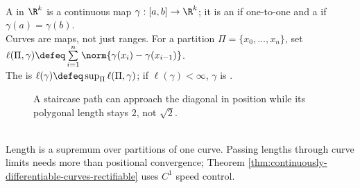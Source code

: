 \begin{definition} \label{def:curves-and-rectifiability} \\
A  in $\R^k$ is a continuous map $\gamma:[a,b]\to\R^k$; it is an  if one-to-one and a  if $\gamma(a)=\gamma(b)$.\\
Curves are maps, not just ranges. For a partition $\Pi=\{x_0,\ldots,x_n\}$, set $\ell(\Pi,\gamma)\defeq\sum\limits_{i=1}^{n}\norm{\gamma(x_i)-\gamma(x_{i-1})}$.\\
The  is $\ell(\gamma)\defeq\sup_\Pi\ell(\Pi,\gamma)$; if $\ell(\gamma)<\infty$, $\gamma$ is .
\end{definition}

\begin{figure}[H]
  \centering
  
  \caption{A staircase path can approach the diagonal in position while its polygonal length stays $2$, not $\sqrt{2}$.}
  \label{fig:staircase-length-vs-chord}
\end{figure}

\begin{perspective} \label{per:length-is-not-position-limit} \\
Length is a supremum over partitions of one curve. Passing lengths through curve limits needs more than positional convergence; Theorem \ref{thm:continuously-differentiable-curves-rectifiable} uses $C^1$ speed control.
\end{perspective}

